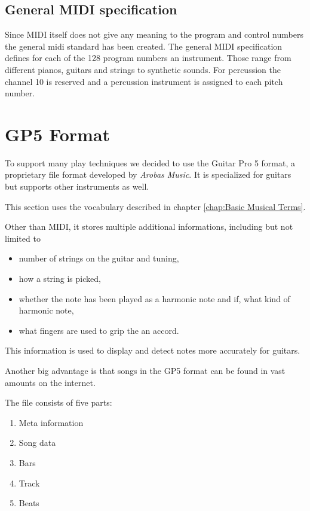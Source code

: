 \subsection{General MIDI specification}
Since MIDI itself does not give any meaning to the program and control numbers the general midi standard has been created. The general MIDI specification defines for each of the 128 program numbers an instrument. Those range from different pianos, guitars and strings to synthetic sounds. For percussion the channel 10 is reserved and a percussion instrument is assigned to each pitch number. 


\section[GP5 Format \textsuperscript{Kugler}]{GP5 Format}
\label{sec:GP5}
To support many play techniques we decided to use the Guitar Pro 5 format, a proprietary file format developed by \emph{Arobas Music}. It is specialized for guitars but supports other instruments as well. 

This section uses the vocabulary described in chapter \ref{chap:Basic Musical Terms}.

Other than MIDI, it stores multiple additional informations, including but not limited to
\begin{itemize}
	\item number of strings on the guitar and tuning,
	\item how a string is picked,
	\item whether the note has been played as a harmonic note and if, what kind of harmonic note,
	\item what fingers are used to grip the an accord.
\end{itemize}

This information is used to display and detect notes more accurately for guitars.

Another big advantage is that songs in the GP5 format can be found in vast amounts on the internet.

The file consists of five parts:
\begin{enumerate}
	\item Meta information
	\item Song data
	\item Bars
	\item Track
	\item Beats
\end{enumerate}

